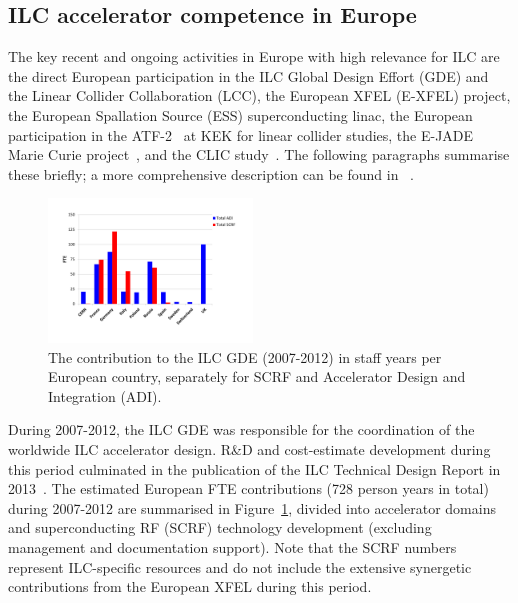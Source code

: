 \documentclass[%
 reprint,
 floatfix,
 amsmath,amssymb,
 aps,
]{revtex4-1}
\begin{document}
\subsection{ILC accelerator competence in Europe~\label{sec:acc:competence}}

The key recent and ongoing activities in Europe with high relevance for ILC are the direct European participation in the ILC Global Design Effort (GDE) and the Linear Collider Collaboration (LCC),
the European XFEL (E-XFEL) project, the European Spallation Source (ESS) superconducting linac, the European 
participation in the ATF-2~\cite{Grishanov:2005ek,Grishanov:2006kx} at KEK for linear collider studies, the E-JADE Marie 
Curie project~\cite{ejade}, and the CLIC study~\cite{Aicheler:2012bya,Linssen:2012hp}. The following paragraphs 
summarise these briefly; a more comprehensive description can be found in ~\cite{ejade-report}. 

\begin{figure}[htbp]
\includegraphics[width=0.4825\textwidth]{figures/EU-GDE-FTE-columns-per-country.pdf}
\caption{\label{fig:PrePrep:ilcgde4} The contribution to the ILC GDE (2007-2012) in staff years per European country, separately for SCRF and Accelerator Design and Integration (ADI).}
\end{figure}

During 2007-2012, the ILC GDE was responsible for the coordination of the worldwide ILC accelerator design. 
R\&D and cost-estimate development during this period culminated in the publication of the ILC Technical Design Report in 2013~\cite{Behnke:2013xla}. 
The estimated European FTE contributions (728 person years in total) during 2007-2012 are summarised in Figure~\ref{fig:PrePrep:ilcgde4}, 
divided into accelerator domains and superconducting RF (SCRF) technology development (excluding management and documentation support). 
Note that the SCRF numbers represent ILC-specific resources and do not include the extensive synergetic contributions from the European XFEL during this period.
\end{document}
